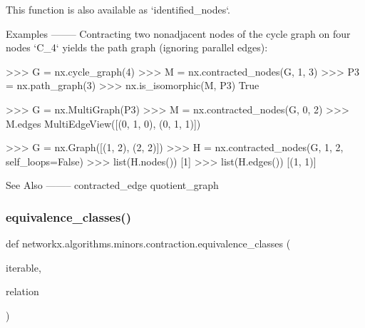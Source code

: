 \begin{DoxyVerb}
This function is also available as `identified_nodes`.

Examples
--------
Contracting two nonadjacent nodes of the cycle graph on four nodes `C_4`
yields the path graph (ignoring parallel edges):

>>> G = nx.cycle_graph(4)
>>> M = nx.contracted_nodes(G, 1, 3)
>>> P3 = nx.path_graph(3)
>>> nx.is_isomorphic(M, P3)
True

>>> G = nx.MultiGraph(P3)
>>> M = nx.contracted_nodes(G, 0, 2)
>>> M.edges
MultiEdgeView([(0, 1, 0), (0, 1, 1)])

>>> G = nx.Graph([(1, 2), (2, 2)])
>>> H = nx.contracted_nodes(G, 1, 2, self_loops=False)
>>> list(H.nodes())
[1]
>>> list(H.edges())
[(1, 1)]

See Also
--------
contracted_edge
quotient_graph\end{DoxyVerb}
 \mbox{\label{namespacenetworkx_1_1algorithms_1_1minors_1_1contraction_a13fe9669829712f1abad4f163fa1f47f}} 
\subsubsection{\texorpdfstring{equivalence\+\_\+classes()}{equivalence\_classes()}}
{\footnotesize\ttfamily def networkx.\+algorithms.\+minors.\+contraction.\+equivalence\+\_\+classes (\begin{DoxyParamCaption}\item[{}]{iterable,  }\item[{}]{relation }\end{DoxyParamCaption})}


